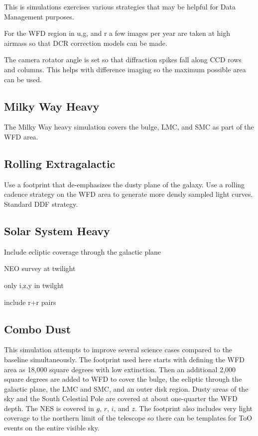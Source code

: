 This is simulations exercises various strategies that may be helpful for Data Management purposes. 

For the WFD region in u,g, and r a few images per year are taken at high airmass so that DCR correction models can be made.

The camera rotator angle is set so that diffraction spikes fall along CCD rows and columns. This helps with difference imaging so the maximum possible area can be used.

\subsection{Milky Way Heavy}

The Milky Way heavy simulation covers the bulge, LMC, and SMC as part of the WFD area.  

\subsection{Rolling Extragalactic}

Use a footprint that de-emphasizes the dusty plane of the galaxy. Use a rolling cadence strategy on the WFD area to generate more densly sampled light curves. Standard DDF strategy.

\subsection{Solar System Heavy}

Include ecliptic coverage through the galactic plane

NEO survey at twilight

only i,z,y in twilght

include r+r pairs

\subsection{Combo Dust}

This simulation attempts to improve several science cases compared to the baseline simultaneously. The footprint used here starts with defining the WFD area as 18,000 square degrees with low extinction. Then an additional 2,000 square degrees are added to WFD to cover the bulge, the ecliptic through the galactic plane, the LMC and SMC, and an outer disk region. Dusty areas of the sky and the South Celestial Pole are covered at about one-quarter the WFD depth. The NES is covered in $g$, $r$, $i$, and $z$. The footprint also includes very light coverage to the northern limit of the telescope so there can be templates for ToO events on the entire visible sky. 


